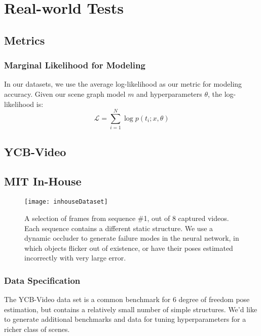 \chapter{Real-world Tests}

\section{Metrics}



\subsection{Marginal Likelihood for Modeling}

In our datasets, we use the average log-likelihood as our metric for modeling accuracy.
Given our scene graph model $m$ and hyperparameters $\theta$, the log-likelihood is:
\[
  \mathcal{L} = \sum_{i=1}^N \log p(t_i; x, \theta)
\]


\section{YCB-Video}

\todo


\section{MIT In-House}

\begin{figure}[h]
  \centering
  \texttt{[image: inhouseDataset]}
  \caption{
    A selection of frames from sequence \#1, out of 8 captured videos.
    Each sequence contains a different static structure.
    We use a dynamic occluder to generate failure modes in the neural network, in which objects flicker out of existence, or have their poses estimated incorrectly with very large error.
  }
\end{figure}

\subsection{Data Specification}

The YCB-Video data set is a common benchmark for 6 degree of freedom pose estimation, but contains a relatively small number of simple structures.
We'd like to generate additional benchmarks and data for tuning hyperparameters for a richer class of scenes.


